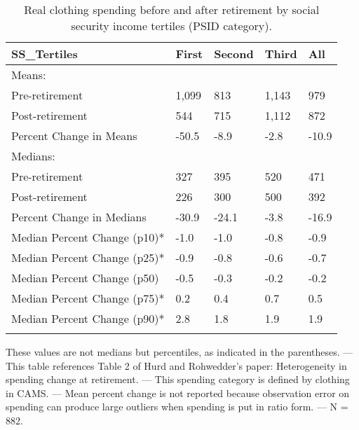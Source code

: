 \begin{table}[tbp] \centering
{}

\caption{Real clothing spending before and after retirement by social security income tertiles (PSID category).}
\begin{tabularx}{\textwidth}{lCCCC}

\toprule
{SS\_Tertiles}&{First}&{Second}&{Third}&{All} \tabularnewline
\midrule\addlinespace[1.5ex]
Means:&&&& \tabularnewline
\midrule Pre-retirement&1,099&813&1,143&979 \tabularnewline
Post-retirement&544&715&1,112&872 \tabularnewline
Percent Change in Means&-50.5&-8.9&-2.8&-10.9 \tabularnewline
\midrule Medians:&&&& \tabularnewline
\midrule Pre-retirement&327&395&520&471 \tabularnewline
Post-retirement&226&300&500&392 \tabularnewline
Percent Change in Medians&-30.9&-24.1&-3.8&-16.9 \tabularnewline
Median Percent Change (p10)*&-1.0&-1.0&-0.8&-0.9 \tabularnewline
Median Percent Change (p25)*&-0.9&-0.8&-0.6&-0.7 \tabularnewline
Median Percent Change (p50)&-0.5&-0.3&-0.2&-0.2 \tabularnewline
Median Percent Change (p75)*&0.2&0.4&0.7&0.5 \tabularnewline
Median Percent Change (p90)*&2.8&1.8&1.9&1.9 \tabularnewline
\bottomrule \addlinespace[1.5ex]

\end{tabularx}
\begin{flushleft}
\footnotesize *These values are not medians but percentiles, as indicated in the parentheses. \linebreak --- \linebreak This table references Table 2 of Hurd and Rohwedder's paper: Heterogeneity in spending change at retirement. \linebreak --- \linebreak This spending category is defined by clothing in CAMS. \linebreak --- \linebreak Mean percent change is not reported because observation error on spending can produce large outliers when spending is put in ratio form. \linebreak --- \linebreak N = 882.
\end{flushleft}
\end{table}
